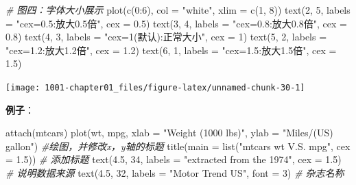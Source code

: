 \documentclass[
]{book}
\newenvironment{Shaded}{\begin{snugshade}}{\end{snugshade}}
\newcommand{\AttributeTok}[1]{\textcolor[rgb]{0.77,0.63,0.00}{#1}}
\newcommand{\CommentTok}[1]{\textcolor[rgb]{0.56,0.35,0.01}{\textit{#1}}}
\newcommand{\DecValTok}[1]{\textcolor[rgb]{0.00,0.00,0.81}{#1}}
\newcommand{\FloatTok}[1]{\textcolor[rgb]{0.00,0.00,0.81}{#1}}
\newcommand{\FunctionTok}[1]{\textcolor[rgb]{0.00,0.00,0.00}{#1}}
\newcommand{\NormalTok}[1]{#1}
\newcommand{\SpecialCharTok}[1]{\textcolor[rgb]{0.00,0.00,0.00}{#1}}
\newcommand{\StringTok}[1]{\textcolor[rgb]{0.31,0.60,0.02}{#1}}
\begin{document}
\begin{Shaded}
\begin{Highlighting}[]
\CommentTok{\# 图四：字体大小展示}
\FunctionTok{plot}\NormalTok{(}\FunctionTok{c}\NormalTok{(}\DecValTok{0}\SpecialCharTok{:}\DecValTok{6}\NormalTok{), }\AttributeTok{col =} \StringTok{"white"}\NormalTok{, }\AttributeTok{xlim =} \FunctionTok{c}\NormalTok{(}\DecValTok{1}\NormalTok{, }\DecValTok{8}\NormalTok{))}
\FunctionTok{text}\NormalTok{(}\DecValTok{2}\NormalTok{, }\DecValTok{5}\NormalTok{, }\AttributeTok{labels =} \StringTok{"cex=0.5:放大0.5倍"}\NormalTok{, }\AttributeTok{cex =} \FloatTok{0.5}\NormalTok{)}
\FunctionTok{text}\NormalTok{(}\DecValTok{3}\NormalTok{, }\DecValTok{4}\NormalTok{, }\AttributeTok{labels =} \StringTok{"cex=0.8:放大0.8倍"}\NormalTok{, }\AttributeTok{cex =} \FloatTok{0.8}\NormalTok{)}
\FunctionTok{text}\NormalTok{(}\DecValTok{4}\NormalTok{, }\DecValTok{3}\NormalTok{, }\AttributeTok{labels =} \StringTok{"cex=1(默认):正常大小"}\NormalTok{, }\AttributeTok{cex =} \DecValTok{1}\NormalTok{)}
\FunctionTok{text}\NormalTok{(}\DecValTok{5}\NormalTok{, }\DecValTok{2}\NormalTok{, }\AttributeTok{labels =} \StringTok{"cex=1.2:放大1.2倍"}\NormalTok{, }\AttributeTok{cex =} \FloatTok{1.2}\NormalTok{)}
\FunctionTok{text}\NormalTok{(}\DecValTok{6}\NormalTok{, }\DecValTok{1}\NormalTok{, }\AttributeTok{labels =} \StringTok{"cex=1.5:放大1.5倍"}\NormalTok{, }\AttributeTok{cex =} \FloatTok{1.5}\NormalTok{)}
\end{Highlighting}
\end{Shaded}

\begin{center}\texttt{[image: 1001-chapter01\_files/figure-latex/unnamed-chunk-30-1]} \end{center}

\textbf{例子}：

\begin{Shaded}
\begin{Highlighting}[]
\FunctionTok{attach}\NormalTok{(mtcars)}
\FunctionTok{plot}\NormalTok{(wt, mpg, }\AttributeTok{xlab =} \StringTok{"Weight (1000 lbs)"}\NormalTok{, }\AttributeTok{ylab =} \StringTok{"Miles/(US) gallon"}\NormalTok{)  }\CommentTok{\#绘图，并修改x，y轴的标题}
\FunctionTok{title}\NormalTok{(}\AttributeTok{main =} \FunctionTok{list}\NormalTok{(}\StringTok{"mtcars wt V.S. mpg"}\NormalTok{, }\AttributeTok{cex =} \FloatTok{1.5}\NormalTok{))  }\CommentTok{\# 添加标题}
\FunctionTok{text}\NormalTok{(}\FloatTok{4.5}\NormalTok{, }\DecValTok{34}\NormalTok{, }\AttributeTok{labels =} \StringTok{"extracted from the 1974"}\NormalTok{, }\AttributeTok{cex =} \FloatTok{1.5}\NormalTok{)  }\CommentTok{\# 说明数据来源}
\FunctionTok{text}\NormalTok{(}\FloatTok{4.5}\NormalTok{, }\DecValTok{32}\NormalTok{, }\AttributeTok{labels =} \StringTok{"Motor Trend US"}\NormalTok{, }\AttributeTok{font =} \DecValTok{3}\NormalTok{)  }\CommentTok{\# 杂志名称}
\end{Highlighting}
\end{Shaded}
\end{document}
